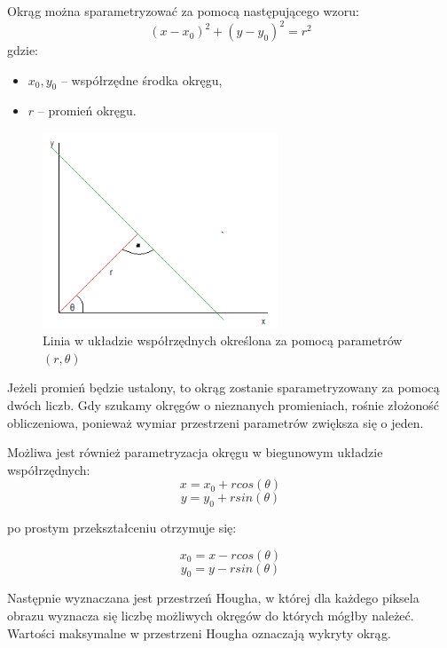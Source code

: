 Okrąg można sparametryzować za pomocą następującego wzoru:
\begin{equation}
(x-x_0)^2+(y-y_0)^2=r^2
\end{equation}
gdzie:
\begin{itemize}
\item $x_0, y_0$ -- współrzędne środka okręgu,
\item $r$ -- promień okręgu.
\end{itemize}

\begin{figure}[h]
\centering
\includegraphics[width=7cm]{img/hough.png}
\caption{Linia w układzie współrzędnych określona za pomocą parametrów $(r, \theta)$}
\label{fig:hough}
\end{figure}

Jeżeli promień będzie ustalony, to okrąg zostanie sparametryzowany za pomocą dwóch liczb. 
Gdy szukamy okręgów o nieznanych promieniach, rośnie złożoność obliczeniowa, ponieważ wymiar przestrzeni parametrów zwiększa się o jeden.

Możliwa jest również parametryzacja okręgu w biegunowym układzie współrzędnych:
\begin{equation}
x = x_0 + rcos(\theta)
\end{equation}
\begin{equation}
y = y_0 + rsin(\theta)
\end{equation}

po prostym przekształceniu otrzymuje się:

\begin{equation}
x_0 = x - rcos(\theta)
\end{equation}
\begin{equation}
y_0 = y - rsin(\theta)
\end{equation}

Następnie wyznaczana jest przestrzeń Hougha, w której dla każdego piksela obrazu wyznacza się liczbę możliwych okręgów do których mógłby należeć. 
Wartości maksymalne w przestrzeni Hougha oznaczają wykryty okrąg.

